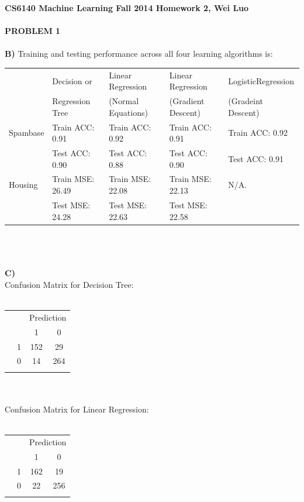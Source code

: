 \documentclass[11pt,a4paper,fleqn]{article}
\begin{document}
\textbf{CS6140 Machine Learning Fall 2014 Homework 2, Wei Luo }\\
\\
\textbf{PROBLEM 1}\\
\\
 \textbf{B)} Training and testing performance across all four learning algorithms is: \\
 
 \hskip-1cm
 \begin{tabular}{|l|l|l|l|l|}
\hline
 &Decision or &Linear Regression &Linear Regression&LogisticRegression\\
 &Regression Tree&(Normal Equations)&(Gradient Descent)&(Gradeint Descent)\\
\hline
Spambase&Train ACC: 0.91&Train ACC: 0.92&Train ACC: 0.91&Train ACC: 0.92\\
&Test ACC: 0.90&Test ACC: 0.88&Test ACC: 0.90&Test ACC: 0.91\\
\hline
Housing&Train MSE: 26.49&Train MSE: 22.08&Train MSE: 22.13&N/A.\\
 &Test MSE: 24.28&Test MSE: 22.63&Test MSE: 22.58&\\
\hline
\end{tabular}\\
\\ \\
 \textbf{C)} \\
 Confusion Matrix for Decision Tree:\\ \\
\begin{tabular}{cc|c|c|}
\multicolumn{2}{c}{}&\multicolumn{2}{c}{Prediction}\\
\multicolumn{2}{c}{}&\multicolumn{1}{c}{1}&\multicolumn{1}{c}{0}\\
\hhline{~~--}
\multirow{2}{*}{Label}
&1&152&29\\
\hhline{~~--}
&0&14&264\\
\hhline{~~--}
\end{tabular}\\ \\
 Confusion Matrix for Linear Regression:\\ \\
\begin{tabular}{cc|c|c|}
\multicolumn{2}{c}{}&\multicolumn{2}{c}{Prediction}\\
\multicolumn{2}{c}{}&\multicolumn{1}{c}{1}&\multicolumn{1}{c}{0}\\
\hhline{~~--}
\multirow{2}{*}{Label}
&1&162&19\\
\hhline{~~--}
&0&22&256\\
\hhline{~~--}
\end{tabular}\\ \\
\end{document}
